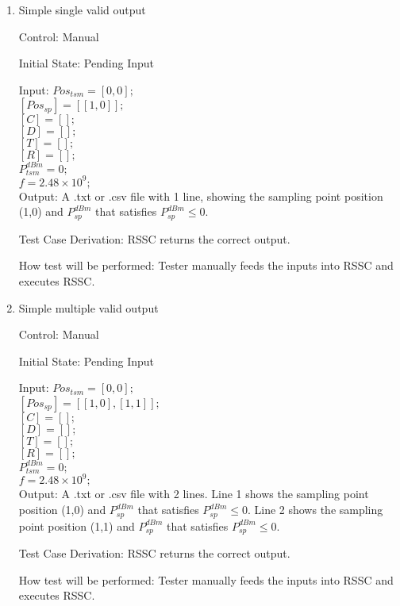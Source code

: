 \documentclass[12pt, titlepage]{article}
\begin{document}
\begin{enumerate}

\item{Simple single valid output\\}

Control: Manual
					
Initial State: Pending Input
					
Input:
$Pos_{tsm} = [0,0];$\\
$[Pos_{sp}] = [[1,0]];$\\
$[C] = [ ];$\\
$[D] = [ ];$\\
$[T] = [ ];$\\
$[R] = [ ];$\\
$P_{tsm}^{dBm} = 0;$\\
$f = 2.48\times10^{9};$\\

Output: A .txt or .csv file with 1 line, showing the sampling point
position (1,0) and $P_{sp}^{dBm}$ that satisfies $P_{sp}^{dBm} 
\leq 0$. 

Test Case Derivation: RSSC returns the correct output.
					
How test will be performed: Tester manually feeds the inputs into
RSSC and executes RSSC.
					

\item{Simple multiple valid output\\}

Control: Manual
					
Initial State: Pending Input
					
Input:
$Pos_{tsm} = [0,0];$\\
$[Pos_{sp}] = [[1,0],[1,1]];$\\
$[C] = [ ];$\\
$[D] = [ ];$\\
$[T] = [ ];$\\
$[R] = [ ];$\\
$P_{tsm}^{dBm} = 0;$\\
$f = 2.48\times10^{9};$\\

Output: A .txt or .csv file with 2 lines. Line 1 shows the sampling point
position (1,0) and $P_{sp}^{dBm}$ that satisfies $P_{sp}^{dBm} 
\leq 0$. Line 2 shows the sampling point position (1,1) and $P_{sp}^{dBm}$ 
that satisfies $P_{sp}^{dBm} \leq 0$. 

Test Case Derivation: RSSC returns the correct output.
					
How test will be performed: Tester manually feeds the inputs into
RSSC and executes RSSC.

\end{enumerate}
\end{document}
